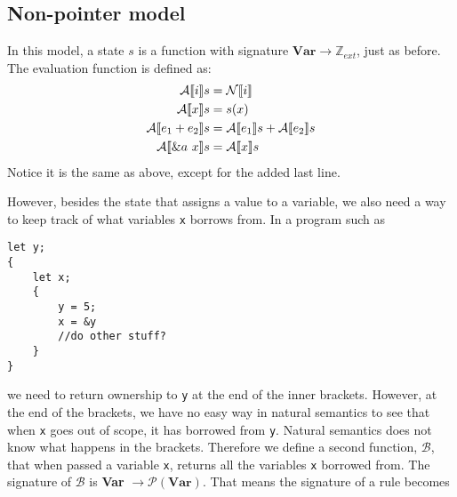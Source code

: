 
\subsection{Non-pointer model}
In this model, a state $s$ is a function with signature $\textbf{Var} \to \mathbb{Z}_{ext}$, just as before. The evaluation function is defined as:
\begin{align*}
    \mathcal{A} \llbracket i \rrbracket s          &= \mathcal{N} \llbracket i \rrbracket
\\  \mathcal{A} \llbracket x \rrbracket s          &= s(x)
\\  \mathcal{A} \llbracket e_1 + e_2 \rrbracket s  &= \mathcal{A} \llbracket e_1 \rrbracket s + \mathcal{A} \llbracket e_2 \rrbracket s
\\ \mathcal{A} \llbracket \&a~x \rrbracket s       &= \mathcal{A} \llbracket x \rrbracket s
\end{align*}
Notice it is the same as above, except for the added last line. 

However, besides the state that assigns a value to a variable, we also need a way to keep track of what variables \verb|x| borrows from. In a program such as 
\begin{verbatim}
let y;
{
    let x;
    {
        y = 5;
        x = &y
        //do other stuff?
    }
}
\end{verbatim}
we need to return ownership to \verb|y| at the end of the inner brackets. However, at the end of the brackets, we have no easy way in natural semantics to see that when \verb|x| goes out of scope, it has borrowed from \verb|y|. Natural semantics does not know what happens in the brackets. Therefore we define a second function, $\mathcal{B}$, that when passed a variable \verb|x|, returns all the variables \verb|x| borrowed from. The signature of $\mathcal{B}$ is \textbf{Var} $\to \mathcal{P}(\textbf{Var})$. That means the signature of a rule becomes 

